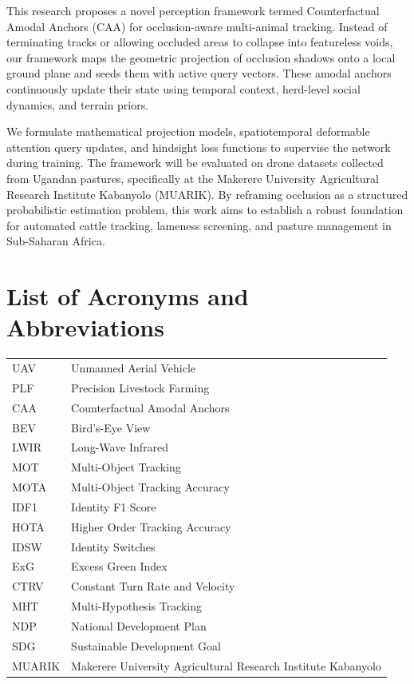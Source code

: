 \documentclass[12pt]{article}
\begin{document}
This research proposes a novel perception framework termed Counterfactual Amodal Anchors (CAA) for occlusion-aware multi-animal tracking. Instead of terminating tracks or allowing occluded areas to collapse into featureless voids, our framework maps the geometric projection of occlusion shadows onto a local ground plane and seeds them with active query vectors. These amodal anchors continuously update their state using temporal context, herd-level social dynamics, and terrain priors. 

We formulate mathematical projection models, spatiotemporal deformable attention query updates, and hindsight loss functions to supervise the network during training. The framework will be evaluated on drone datasets collected from Ugandan pastures, specifically at the Makerere University Agricultural Research Institute Kabanyolo (MUARIK). By reframing occlusion as a structured probabilistic estimation problem, this work aims to establish a robust foundation for automated cattle tracking, lameness screening, and pasture management in Sub-Saharan Africa.
\clearpage

\tableofcontents
\clearpage
\listoftables
\clearpage
\listoffigures
\clearpage

\section*{\centering \textbf{List of Acronyms and Abbreviations}}
\begin{tabular}{ll}
    UAV & Unmanned Aerial Vehicle \\
    PLF & Precision Livestock Farming \\
    CAA & Counterfactual Amodal Anchors \\
    BEV & Bird's-Eye View \\
    LWIR & Long-Wave Infrared \\
    MOT & Multi-Object Tracking \\
    MOTA & Multi-Object Tracking Accuracy \\
    IDF1 & Identity F1 Score \\
    HOTA & Higher Order Tracking Accuracy \\
    IDSW & Identity Switches \\
    ExG & Excess Green Index \\
    CTRV & Constant Turn Rate and Velocity \\
    MHT & Multi-Hypothesis Tracking \\
    NDP & National Development Plan \\
    SDG & Sustainable Development Goal \\
    MUARIK & Makerere University Agricultural Research Institute Kabanyolo \\
\end{tabular}
\clearpage
\end{document}
